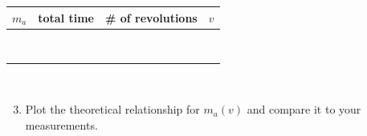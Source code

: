 \documentclass[11pt,letterpaper]{article}
\begin{document}
%
\begin{tabularx}{\linewidth}{|Y|Y|Y|Y|}
\hline
$m_a$ & total time & \# of revolutions & $v$\\
\hline\vspace{2cm}&\vspace{2cm}&\vspace{2cm}&\vspace{2cm}\\
\vspace{2cm}&\vspace{2cm}&\vspace{2cm}&\vspace{2cm}\\
\hline\vspace{2cm}&\vspace{2cm}&\vspace{2cm}&\vspace{2cm}\\
\vspace{2cm}&\vspace{2cm}&\vspace{2cm}&\vspace{2cm}\\
\hline\vspace{2cm}&\vspace{2cm}&\vspace{2cm}&\vspace{2cm}\\
\vspace{2cm}&\vspace{2cm}&\vspace{2cm}&\vspace{2cm}\\
\hline\vspace{2cm}&\vspace{2cm}&\vspace{2cm}&\vspace{2cm}\\
\vspace{2cm}&\vspace{2cm}&\vspace{2cm}&\vspace{2cm}\\
\hline
\end{tabularx}\\

\begin{enumerate}
\setcounter{enumi}{2}
\item Plot the theoretical relationship for $m_a(v)$ and compare it to your measurements.
\end{enumerate}
\end{document}
